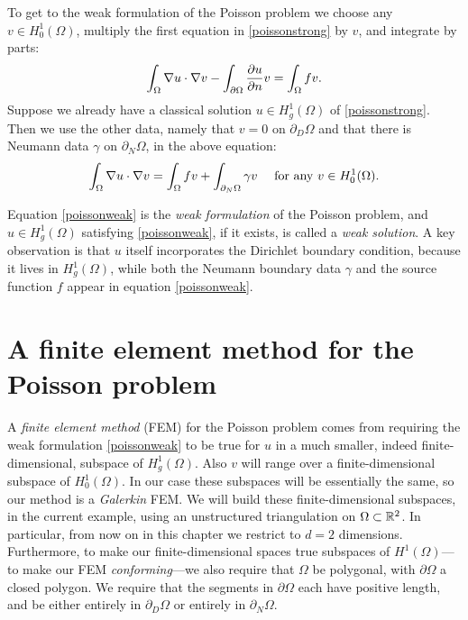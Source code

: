 To get to the weak formulation of the Poisson problem we choose any $v\in H_0^1(\Omega)$, multiply the first equation in \eqref{poissonstrong} by $v$, and integrate by parts:
\begin{equation*}
\int_\Omega \nabla u \cdot \nabla v - \int_{\partial\Omega} \frac{\partial u}{\partial n} v = \int_\Omega f v.
\end{equation*}
Suppose we already have a classical solution $u\in H_g^1(\Omega)$ of \eqref{poissonstrong}.  Then we use the other data, namely that $v=0$ on $\partial_D\Omega$ and that there is Neumann data $\gamma$ on $\partial_N\Omega$, in the above equation:
\begin{equation}
\int_\Omega \nabla u \cdot \nabla v = \int_\Omega f v + \int_{\partial_N\Omega} \gamma v\quad \text{ for any } v\in H_0^1(\Omega). \label{poissonweak}
\end{equation}

Equation \eqref{poissonweak} is the \emph{weak formulation} of the Poisson problem, and $u \in H_g^1(\Omega)$ satisfying \eqref{poissonweak}, if it exists, is called a \emph{weak solution}.  A key observation is that $u$ itself incorporates the Dirichlet boundary condition, because it lives in $H_g^1(\Omega)$, while both the Neumann boundary data $\gamma$ and the source function $f$ appear in equation \eqref{poissonweak}.


\section{A finite element method for the Poisson problem}

A \emph{finite element method} (FEM) for the Poisson problem comes from requiring the weak formulation \eqref{poissonweak} to be true for $u$ in a much smaller, indeed finite-dimensional, subspace of $H_g^1(\Omega)$.  Also $v$ will range over a finite-dimensional subspace of $H_0^1(\Omega)$.  In our case these subspaces will be essentially the same, so our method is a \emph{Galerkin} FEM.  We will build these finite-dimensional subspaces, in the current example, using an unstructured triangulation on $\Omega\subset \mathbb{R}^2$.  In particular, from now on in this chapter we restrict to $d=2$ dimensions.  Furthermore, to make our finite-dimensional spaces true subspaces of $H^1(\Omega)$---to make our FEM \emph{conforming}---we also require that $\Omega$ be polygonal, with $\partial\Omega$ a closed polygon.  We require that the segments in $\partial\Omega$ each have positive length, and be either entirely in $\partial_D\Omega$ or entirely in $\partial_N\Omega$.

